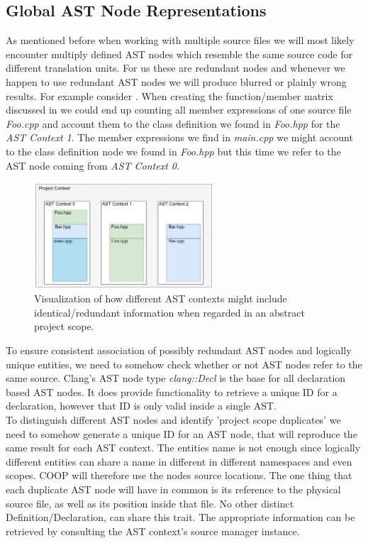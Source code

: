 \subsection{Global AST Node Representations}
As mentioned before when working with multiple source files we will most likely encounter multiply defined AST nodes which resemble the same source code for different translation units. For us these are redundant nodes and whenever we happen to use redundant AST nodes we will produce blurred or plainly wrong results. For example consider . When creating the function/member matrix discussed in  we could end up counting all member expressions of one source file \textit{Foo.cpp} and account them to the class definition we found in \textit{Foo.hpp} for the \textit{AST Context 1}. The member expressions we find in \textit{main.cpp} we might account to the class definition node we found in \textit{Foo.hpp} but this time we refer to the AST node coming from \textit{AST Context 0}.
\begin{figure}[!htbp]
	\centering
	\includegraphics[width=0.6\textwidth, height=0.4\textwidth]{PICs/project_context}
	\caption{Visualization of how different AST contexts might include identical/redundant information when regarded in an abstract project scope.}
	\label{project_context}
\end{figure}
To ensure consistent association of possibly redundant AST nodes and logically unique entities, we need to somehow check whether or not AST nodes refer to the same source. Clang's AST node type \textit{clang::Decl} is the base for all declaration based AST nodes. It does provide functionality to retrieve a unique ID for a declaration, however that ID is only valid inside a single AST.\\
To distinguish different AST nodes and identify 'project scope duplicates' we need to somehow generate a unique ID for an AST node, that will reproduce the same result for each AST context. The entities name is not enough since logically different entities can share a name in different in different namespaces and even scopes. COOP will therefore use the nodes source locations. The one thing that each duplicate AST node will have in common is its reference to the physical source file, as well as its position inside that file. No other distinct Definition/Declaration, can share this trait. The appropriate information can be retrieved by consulting the AST context's source manager instance.\\
